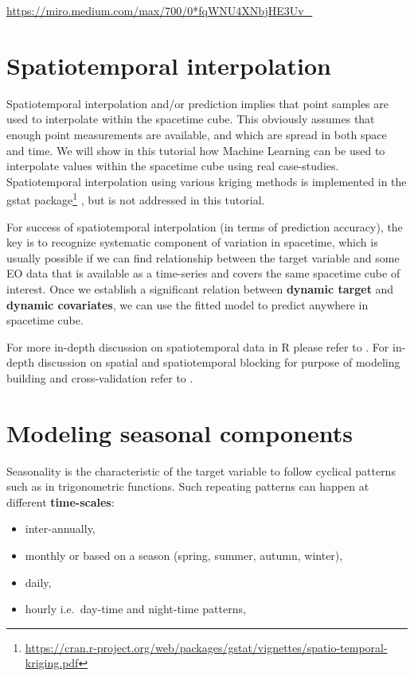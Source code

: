 \documentclass[
  graybox,natbib,nospthms]{svmono}
\providecommand{\tightlist}{%
  \setlength{\itemsep}{0pt}\setlength{\parskip}{0pt}}
\providecommand{\tightlist}{\setlength{\itemsep}{0pt}\setlength{\parskip}{0pt}}
\renewcommand{\href}[2]{#2 (\url{#1})}
\renewcommand{\href}[2]{#2\footnote{\url{#1}}}
\begin{document}
\url{https://miro.medium.com/max/700/0*fqWNU4XNbjHE3Uv_}

\hypertarget{spatiotemporal-interpolation}{%
\section{Spatiotemporal interpolation}\label{spatiotemporal-interpolation}}

Spatiotemporal interpolation and/or prediction implies that point
samples are used to interpolate within the spacetime cube. This
obviously assumes that enough point measurements are available, and which are spread in
both space and time. We will show in this tutorial how Machine Learning can
be used to interpolate values within the spacetime cube using real case-studies.
Spatiotemporal interpolation using various kriging methods is implemented in
the \href{https://cran.r-project.org/web/packages/gstat/vignettes/spatio-temporal-kriging.pdf}{gstat package} \citep{Bivand2013Springer}, but is not addressed in this tutorial.

For success of spatiotemporal interpolation (in terms of prediction accuracy),
the key is to recognize systematic component of variation in spacetime, which
is usually possible if we can find relationship between the target variable and
some EO data that is available as a time-series and covers the same spacetime cube
of interest. Once we establish a significant relation between \textbf{dynamic target} and
\textbf{dynamic covariates}, we can use the fitted model to predict anywhere in spacetime cube.

For more in-depth discussion on spatiotemporal data in R please refer to
\citet{wikle2019spatio}. For in-depth discussion on spatial and spatiotemporal
blocking for purpose of modeling building and cross-validation refer to
\citet{roberts2017cross}.

\hypertarget{modeling-seasonal-components}{%
\section{Modeling seasonal components}\label{modeling-seasonal-components}}

Seasonality is the characteristic of the target variable to follow cyclical
patterns such as in trigonometric functions. Such repeating patterns can happen
at different \textbf{time-scales}:

\begin{itemize}
\tightlist
\item
  inter-annually,\\
\item
  monthly or based on a season (spring, summer, autumn, winter),\\
\item
  daily,\\
\item
  hourly i.e.~day-time and night-time patterns,
\end{itemize}
\end{document}
